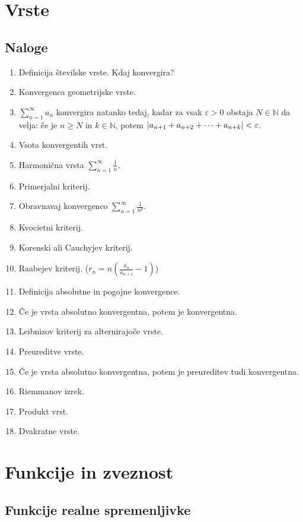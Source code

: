 \documentclass[a4paper,12pt]{report}
\begin{document}
\chapter{Vrste}

\section*{Naloge}

\begin{enumerate}
    \item Definicija številske vrste. Kdaj konvergira?
    \item Konvergenca geometrijske vrste.
    \item $\sum_{n=1}^{\infty}a_n$ konvergira natanko tedaj, kadar za vsak $\varepsilon > 0$ obstaja $N \in \mathbb{N}$ da velja:
            če je $n \geq N$ in $k \in \mathbb{N}$, potem $\abs{a_{n+1} + a_{n+2} + \dots + a_{n+k}} < \varepsilon$.
    \item Vsota konvergentih vrst.
    \item Harmonična vrsta $\sum_{n=1}^{\infty} \frac{1}{n}$.
    \item Primerjalni kriterij.
    \item Obravnavaj konvergenco $\sum_{n=1}^{\infty} \frac{1}{n^p}$.
    \item Kvocietni kriterij.
    \item Korenski ali Cauchyjev kriterij.
    \item Raabejev kriterij. ($r_n = n (\frac{a_n}{a_{n+1}} - 1)$)
    \item Definicija absolutne in pogojne konvergence.
    \item Če je vrsta absolutno konvergentna, potem je konvergentna.
    \item Leibnizov kriterij za alternirajoče vrste.
    \item Preureditve vrste.
    \item Če je vrsta absolutno konvergentna, potem je preureditev tudi konvergentna.
    \item Riemmanov izrek.
    \item Produkt vrst.
    \item Dvakratne vrste.
\end{enumerate}


\chapter{Funkcije in zveznost}

\section*{Funkcije realne spremenljivke}
\end{document}
